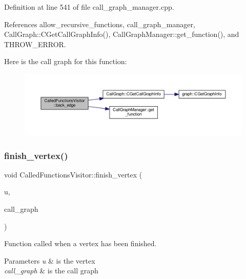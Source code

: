 Definition at line 541 of file call\+\_\+graph\+\_\+manager.\+cpp.



References allow\+\_\+recursive\+\_\+functions, call\+\_\+graph\+\_\+manager, Call\+Graph\+::\+C\+Get\+Call\+Graph\+Info(), Call\+Graph\+Manager\+::get\+\_\+function(), and T\+H\+R\+O\+W\+\_\+\+E\+R\+R\+OR.

Here is the call graph for this function\+:
\nopagebreak
\begin{figure}[H]
\begin{center}
\leavevmode
\includegraphics[width=350pt]{d6/da4/structCalledFunctionsVisitor_a686b4650c2dd295bad0d73ba7aa6cae9_cgraph}
\end{center}
\end{figure}
\mbox{\label{structCalledFunctionsVisitor_a641abe95937af8e1d2fbafcc5b27a098}} 
\subsubsection{\texorpdfstring{finish\+\_\+vertex()}{finish\_vertex()}}
{\footnotesize\ttfamily void Called\+Functions\+Visitor\+::finish\+\_\+vertex (\begin{DoxyParamCaption}\item[{const \hyperlink{graph_8hpp_abefdcf0544e601805af44eca032cca14}{vertex} \&}]{u,  }\item[{const \hyperlink{classCallGraph}{Call\+Graph} \&}]{call\+\_\+graph }\end{DoxyParamCaption})}



Function called when a vertex has been finished. 


\begin{DoxyParams}{Parameters}
{\em u} & is the vertex \\
\hline
{\em call\+\_\+graph} & is the call graph \\
\hline
\end{DoxyParams}


